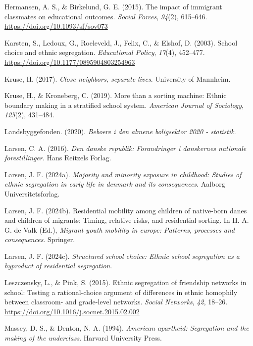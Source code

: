 \documentclass[
]{book}
\newlength{\cslhangindent}
\newenvironment{CSLReferences}[2] %
 {\begin{list}{}{%
  \setlength{\itemindent}{0pt}
  \setlength{\leftmargin}{0pt}
  \setlength{\parsep}{0pt}
  \ifodd #1
   \setlength{\leftmargin}{\cslhangindent}
   \setlength{\itemindent}{-1\cslhangindent}
  \fi
  \setlength{\itemsep}{#2\baselineskip}}}
 {\end{list}}
\begin{document}
\begin{CSLReferences}{1}{0}
Hermansen, A. S., \& Birkelund, G. E. (2015). The impact of immigrant classmates on educational outcomes. \emph{Social Forces}, \emph{94}(2), 615--646. \url{https://doi.org/10.1093/sf/sov073}

Karsten, S., Ledoux, G., Roeleveld, J., Felix, C., \& Elshof, D. (2003). School choice and ethnic segregation. \emph{Educational Policy}, \emph{17}(4), 452--477. \url{https://doi.org/10.1177/0895904803254963}

Kruse, H. (2017). \emph{Close neighbors, separate lives}. University of Mannheim.

Kruse, H., \& Kroneberg, C. (2019). More than a sorting machine: Ethnic boundary making in a stratified school system. \emph{American Journal of Sociology}, \emph{125}(2), 431--484.

Landsbyggefonden. (2020). \emph{Beboere i den almene boligsektor 2020 - statistik}.

Larsen, C. A. (2016). \emph{Den danske republik: Forandringer i danskernes nationale forestillinger}. Hans Reitzels Forlag.

Larsen, J. F. (2024a). \emph{Majority and minority exposure in childhood: Studies of ethnic segregation in early life in denmark and its consequences}. Aalborg Universitetsforlag.

Larsen, J. F. (2024b). Residential mobility among children of native-born danes and children of migrants: Timing, relative risks, and residential sorting. In H. A. G. de Valk (Ed.), \emph{Migrant youth mobility in europe: Patterns, processes and consequences}. Springer.

Larsen, J. F. (2024c). \emph{Structured school choice: Ethnic school segregation as a byproduct of residential segregation}.

Leszczensky, L., \& Pink, S. (2015). Ethnic segregation of friendship networks in school: Testing a rational-choice argument of differences in ethnic homophily between classroom- and grade-level networks. \emph{Social Networks}, \emph{42}, 18--26. \url{https://doi.org/10.1016/j.socnet.2015.02.002}

Massey, D. S., \& Denton, N. A. (1994). \emph{American apartheid: Segregation and the making of the underclass}. Harvard University Press.


\end{CSLReferences}
\end{document}
